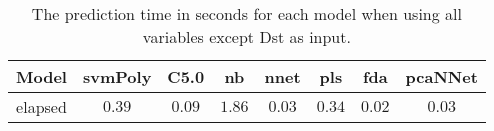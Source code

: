 \begin{table}[!ht]
	\centering
	\begin{tabular}{|c|c|c|c|c|c|c|c|}
		\hline
		Model & svmPoly & C5.0 & nb & nnet & pls & fda & pcaNNet \\ \hline
		elapsed & $0.39$ & $0.09$ & $1.86$ & $0.03$ & $0.34$ & $0.02$ & $0.03$ \\ \hline
	\end{tabular}
	\caption{The prediction time in seconds for each model when using all variables except Dst as input.}
	\label{tab:time:reverse:noDst:predict}
\end{table}
